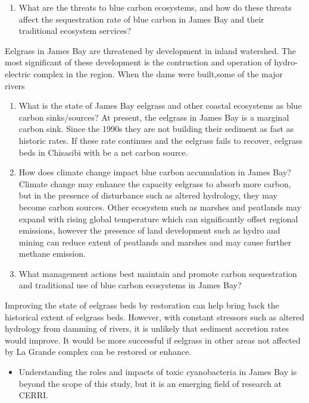 \documentclass[
  12pt,
]{article}
\providecommand{\tightlist}{%
  \setlength{\itemsep}{0pt}\setlength{\parskip}{0pt}}
\begin{document}
\begin{enumerate}
\def\labelenumi{\arabic{enumi}.}
\setcounter{enumi}{1}
\tightlist
\item
  What are the threats to blue carbon ecosystems, and how do these
  threats affect the sequestration rate of blue carbon in James Bay and
  their traditional ecosystem services?
\end{enumerate}

Eelgrass in James Bay are threatened by development in inland watershed.
The most significant of these development is the contruction and
operation of hydro-electric complex in the region. When the dams were
built,some of the major rivers

\begin{enumerate}
\def\labelenumi{\arabic{enumi}.}
\setcounter{enumi}{2}
\item
  What is the state of James Bay eelgrass and other coastal ecosystems
  as blue carbon sinks/sources? At present, the eelgrass in James Bay is
  a marginal carbon sink. Since the 1990s they are not building their
  sediment as fast as historic rates. If these rate continues and the
  eelgrass fails to recover, eelgrass beds in Chisasibi with be a net
  carbon source.
\item
  How does climate change impact blue carbon accumulation in James Bay?
  Climate change may enhance the capacity eelgrass to absorb more
  carbon, but in the presence of disturbance such as altered hydrology,
  they may become carbon sources. Other ecosystem such as marshes and
  peatlands may expand with rising global temperature which can
  significantly offset regional emissions, however the presence of land
  development such as hydro and mining can reduce extent of peatlands
  and marshes and may cause further methane emission.
\item
  What management actions best maintain and promote carbon sequestration
  and traditional use of blue carbon ecosystems in James Bay?
\end{enumerate}

Improving the state of eelgrass beds by restoration can help bring back
the historical extent of eelgrass beds. However, with constant stressors
such as altered hydrology from damming of rivers, it is unlikely that
sediment accretion rates would improve. It would be more successful if
eelgrass in other areas not affected by La Grande complex can be
restored or enhance.

\begin{itemize}
\tightlist
\item
  Understanding the roles and impacts of toxic cyanobacteria in James
  Bay is beyond the scope of this study, but it is an emerging field of
  research at CERRI.
\end{itemize}
\end{document}
